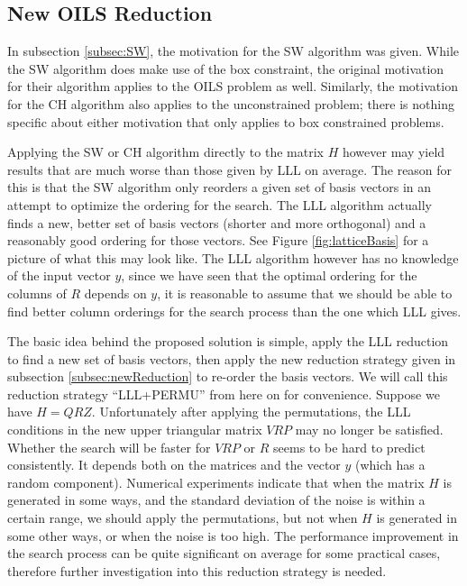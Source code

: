 \documentclass[12pt,Bold,letterpaper]{mcgilletdclass}
\newcommand{\vsp}{\vspace{\baselineskip}}
\begin{document}
\vsp \subsection{New OILS Reduction}
In subsection \ref{subsec:SW}, the motivation for the SW algorithm was given. While the SW algorithm does make use of the box constraint, the original motivation for their algorithm applies to the OILS problem as well. Similarly, the motivation for the CH algorithm also applies to the unconstrained problem; there is nothing specific about either motivation that only applies to box constrained problems. 

Applying the SW or CH algorithm directly to the matrix $H$ however may yield results that are much worse than those given by LLL on average. The reason for this is that the SW algorithm only reorders a given set of basis vectors in an attempt to optimize the ordering for the search. The LLL algorithm actually finds a new, better set of basis vectors (shorter and more orthogonal) and a reasonably good ordering for those vectors. See Figure \ref{fig:latticeBasis} for a picture of what this may look like. The LLL algorithm however has no knowledge of the input vector $y$, since we have seen that the optimal ordering for the columns of $R$ depends on $y$, it is reasonable to assume that we should be able to find better column orderings for the search process than the one which LLL gives.

The basic idea behind the proposed solution is simple, apply the LLL reduction to find a new set of basis vectors, then apply the new reduction strategy given in subsection \ref{subsec:newReduction} to re-order the basis vectors. We will call this reduction strategy ``LLL+PERMU'' from here on for convenience. Suppose we have $H=QRZ$. Unfortunately after applying the permutations, the LLL conditions in the new upper triangular matrix $VRP$ may no longer be satisfied. Whether the search will be faster for $VRP$ or $R$ seems to be hard to predict consistently. It depends both on the matrices and the vector $y$ (which has a random component). Numerical experiments indicate that when the matrix $H$ is generated in some ways, and the standard deviation of the noise is within a certain range, we should apply the permutations, but not when $H$ is generated in some other ways, or when the noise is too high. The performance improvement in the search process can be quite significant on average for some practical cases, therefore further investigation into this reduction strategy is needed.
\end{document}
